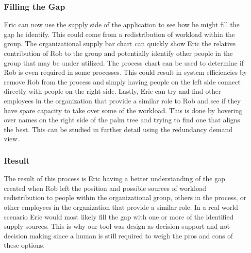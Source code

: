 \message{ !name(FinalPaper.tex)}\documentclass[journal]{vgtc}                %
\begin{document}
\subsubsection{Filling the Gap}
Eric can now use the supply side of the application to see how he might fill the gap he identify.  This could come from a redistribution of workload within the group.  The organizational supply bar chart can quickly show Eric the relative contribution of Rob to the group and potentially identify other people in the group that may be under utilized.
The process chart can be used to determine if Rob is even required in some processes.  This could result in system efficiencies by remove Rob from the process and simply having people on the left side connect directly with people on the right side.
Lastly, Eric can try and find other employees in the organization that provide a similar role to Rob and see if they have spare capacity to take over some of the workload.  This is done by hovering over names on the right side of the palm tree and trying to find one that aligns the best.  This can be studied in further detail using the redundancy demand view.

\subsubsection{Result}
The result of this process is Eric having a better understanding of the gap created when Rob left the position and possible sources of workload redistribution to people within the organizational group, others in the process, or other employees in the organization that provide a similar role.
In a real world scenario Eric would most likely fill the gap with one or more of the identified supply sources.  This is why our tool was design as decision support and not decision making since a human is still required to weigh the pros and cons of these options.
\end{document}
